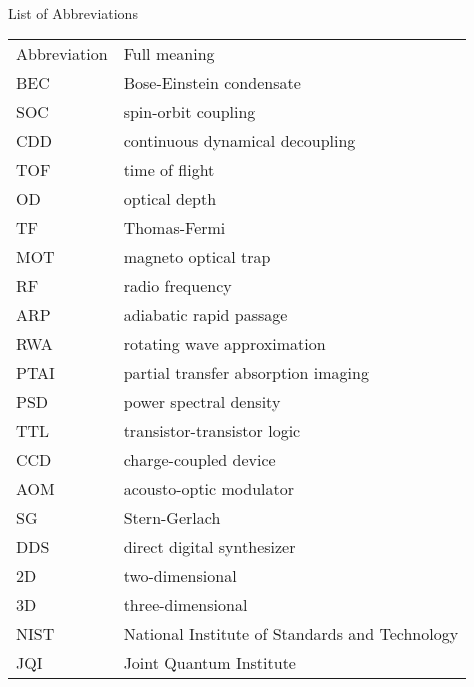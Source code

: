 
\renewcommand{\baselinestretch}{1}
\small\normalsize
\hbox{\ }

\vspace{-3em}


\begin{center}
\large{List of Abbreviations}
\end{center} 

\vspace{3pt}

\begin{tabular}{ll}
Abbreviation & Full meaning \\
BEC & Bose-Einstein condensate \\
SOC & spin-orbit coupling \\
CDD & continuous dynamical decoupling \\
TOF & time of flight \\
OD & optical depth \\
TF & Thomas-Fermi \\
MOT & magneto optical trap \\
RF & radio frequency \\
ARP & adiabatic rapid passage \\
RWA & rotating wave approximation \\
PTAI & partial transfer absorption imaging \\
PSD & power spectral density \\
TTL & transistor-transistor logic \\
CCD & charge-coupled device \\
AOM & acousto-optic modulator \\
SG & Stern-Gerlach \\
DDS & direct digital synthesizer \\
2D & two-dimensional \\
3D & three-dimensional \\

NIST & National Institute of Standards and Technology \\
JQI & Joint Quantum Institute
\end{tabular}
